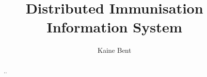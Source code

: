 \documentclass{report}
\title{Distributed Immunisation Information System}
\author{Kaine Bent}
\begin{document}
\begin{titlepage}
\maketitle
\end{titlepage}

\begin{abstract}
..
\end{abstract}

\begin{flushleft}



\end{flushleft}
\end{document}
